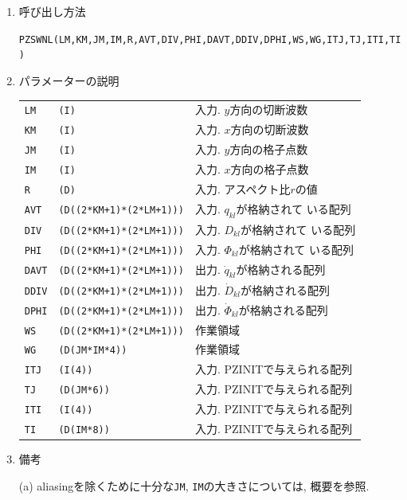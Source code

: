 \documentclass[a4j,fleqn]{jarticle}
\begin{document}
\begin{enumerate}
\item 呼び出し方法 

{\tt PZSWNL(LM,KM,JM,IM,R,AVT,DIV,PHI,DAVT,DDIV,DPHI,WS,WG,ITJ,TJ,ITI,TI)}
  
\item パラメーターの説明

\begin{tabular}{lll}
{\tt LM} & {\tt (I)} & 入力. $y$方向の切断波数\\
{\tt KM} & {\tt (I)} & 入力. $x$方向の切断波数\\
{\tt JM} & {\tt (I)} & 入力. $y$方向の格子点数\\
{\tt IM} & {\tt (I)} & 入力. $x$方向の格子点数\\
{\tt R} & {\tt (D)} & 入力. アスペクト比$r$の値\\
{\tt AVT} & {\tt (D((2*KM+1)*(2*LM+1)))} & 入力. $q_{kl}$が格納されて
いる配列\\
{\tt DIV} & {\tt (D((2*KM+1)*(2*LM+1)))} & 入力. $D_{kl}$が格納されて
いる配列\\
{\tt PHI} & {\tt (D((2*KM+1)*(2*LM+1)))} & 入力. $\Phi_{kl}$が格納されて
いる配列\\
{\tt DAVT} & {\tt (D((2*KM+1)*(2*LM+1)))} & 出力. 
$\dot q_{kl}$が格納される配列\\
{\tt DDIV} & {\tt (D((2*KM+1)*(2*LM+1)))} & 出力.
$\dot D_{kl}$が格納される配列\\
{\tt DPHI} & {\tt (D((2*KM+1)*(2*LM+1)))} & 出力.
$\dot \Phi_{kl}$が格納される配列\\
{\tt WS} & {\tt (D((2*KM+1)*(2*LM+1)))} & 作業領域\\
{\tt WG} & {\tt (D(JM*IM*4))} & 作業領域\\
{\tt ITJ} & {\tt (I(4))} & 入力. PZINITで与えられる配列\\
{\tt TJ} & {\tt (D(JM*6))} & 入力. PZINITで与えられる配列\\
{\tt ITI} & {\tt (I(4))} & 入力. PZINITで与えられる配列\\
{\tt TI} & {\tt (D(IM*8))} & 入力. PZINITで与えられる配列
\end{tabular}

\item 備考

(a) aliasingを除くために十分な{\tt JM}, {\tt IM}の大きさについては, 
概要を参照.

\end{enumerate}

\end{document}

